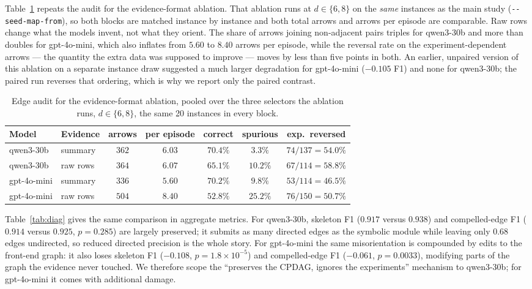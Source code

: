 \documentclass{article}
\begin{document}
Table~\ref{tab:audit_raw} repeats the audit for the evidence-format ablation. That ablation
runs at $d \in \{6,8\}$ on the \emph{same} instances as the main study
(\texttt{-\/-seed-map-from}), so both blocks are matched instance by instance and both total
arrows and arrows per episode are comparable. Raw rows change what the models invent, not what
they orient. The share of arrows joining non-adjacent pairs triples for qwen3-30b and more than
doubles for gpt-4o-mini, which also inflates from $5.60$ to $8.40$ arrows per episode, while
the reversal rate on the experiment-dependent arrows --- the quantity the extra data was
supposed to improve --- moves by less than five points in both. An earlier, unpaired version of
this ablation on a separate instance draw suggested a much larger degradation for gpt-4o-mini
($-0.105$ F1) and none for qwen3-30b; the paired run reverses that ordering, which is why we
report only the paired contrast.

\begin{table}[h]
\caption{Edge audit for the evidence-format ablation, pooled over the three selectors the
ablation runs, $d \in \{6,8\}$, the same 20 instances in every block.}
\label{tab:audit_raw}
\centering
\small
\begin{tabular}{llccccc}
\toprule
Model & Evidence & arrows & per episode & correct & spurious & exp.\ reversed \\
\midrule
qwen3-30b & summary & $362$ & $6.03$ & $70.4\%$ & $3.3\%$ & $74/137 = 54.0\%$ \\
qwen3-30b & raw rows & $364$ & $6.07$ & $65.1\%$ & $\mathbf{10.2\%}$ & $67/114 = 58.8\%$ \\
gpt-4o-mini & summary & $336$ & $5.60$ & $70.2\%$ & $9.8\%$ & $53/114 = 46.5\%$ \\
gpt-4o-mini & raw rows & $504$ & $8.40$ & $52.8\%$ & $\mathbf{25.2\%}$ & $76/150 = 50.7\%$ \\
\bottomrule
\end{tabular}
\end{table}

Table~\ref{tab:diag} gives the same comparison in aggregate metrics. For qwen3-30b, skeleton
F1 ($0.917$ versus $0.938$) and compelled-edge F1 ($0.914$ versus $0.925$, $p=0.285$) are
largely preserved; it submits as many directed edges as the symbolic module while leaving
only $0.68$ edges undirected, so reduced directed precision is the whole story. For
gpt-4o-mini the same misorientation is compounded by edits to the front-end graph: it also
loses skeleton F1 ($-0.108$, $p=1.8\times10^{-5}$) and compelled-edge F1 ($-0.061$,
$p=0.0033$), modifying parts of the graph the evidence never touched. We therefore scope the
``preserves the CPDAG, ignores the experiments'' mechanism to qwen3-30b; for gpt-4o-mini it
comes with additional damage.
\end{document}
